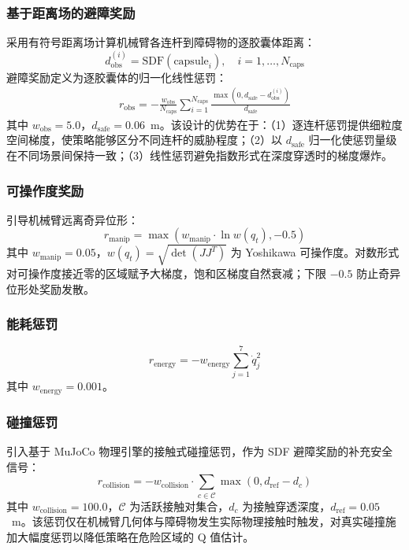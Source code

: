 \documentclass[10pt,conference]{IEEEtran}
\begin{document}
\subsubsection{基于距离场的避障奖励}
采用有符号距离场计算机械臂各连杆到障碍物的逐胶囊体距离：
\begin{equation}
d_{\text{obs}}^{(i)} = \text{SDF}(\text{capsule}_i), \quad i = 1, \dots, N_{\text{caps}}
\label{eq:sdf_distance}
\end{equation}
避障奖励定义为逐胶囊体的归一化线性惩罚：
\begin{equation}
\begin{aligned}
r_{\text{obs}} = -\frac{w_{\text{obs}}}{N_{\text{caps}}} \sum_{i=1}^{N_{\text{caps}}}
\frac{\max(0, d_{\text{safe}} - d_{\text{obs}}^{(i)})}{d_{\text{safe}}}
\end{aligned}
\label{eq:obs_reward}
\end{equation}
其中 $w_{\text{obs}}=5.0$，$d_{\text{safe}}=0.06$~m。该设计的优势在于：（1）逐连杆惩罚提供细粒度空间梯度，使策略能够区分不同连杆的威胁程度；（2）以 $d_{\text{safe}}$ 归一化使惩罚量级在不同场景间保持一致；（3）线性惩罚避免指数形式在深度穿透时的梯度爆炸。

\subsubsection{可操作度奖励}
引导机械臂远离奇异位形：
\begin{equation}
r_{\text{manip}} = \max\left(w_{\text{manip}} \cdot \ln w(q_t), -0.5\right)
\label{eq:manip_reward}
\end{equation}
其中 $w_{\text{manip}}=0.05$，$w(q_t) = \sqrt{\det(JJ^T)}$ 为 Yoshikawa 可操作度。对数形式对可操作度接近零的区域赋予大梯度，饱和区梯度自然衰减；下限 $-0.5$ 防止奇异位形处奖励发散。

\subsubsection{能耗惩罚}
\begin{equation}
r_{\text{energy}} = -w_{\text{energy}} \sum_{j=1}^{7} \dot{q}_j^2
\label{eq:energy_reward}
\end{equation}
其中 $w_{\text{energy}}=0.001$。

\subsubsection{碰撞惩罚}
引入基于 MuJoCo 物理引擎的接触式碰撞惩罚，作为 SDF 避障奖励的补充安全信号：
\begin{equation}
r_{\text{collision}} = -w_{\text{collision}} \cdot \sum_{c \in \mathcal{C}} \max(0, d_{\text{ref}} - d_c)
\label{eq:collision_reward}
\end{equation}
其中 $w_{\text{collision}}=100.0$，$\mathcal{C}$ 为活跃接触对集合，$d_c$ 为接触穿透深度，$d_{\text{ref}}=0.05$~m。该惩罚仅在机械臂几何体与障碍物发生实际物理接触时触发，对真实碰撞施加大幅度惩罚以降低策略在危险区域的 Q 值估计。
\end{document}
